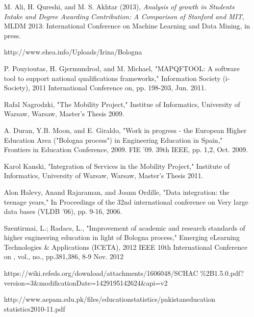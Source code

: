 \documentclass[12pt,a4paper,oneside]{book}
\begin{document}
	
	
	
	




\begin{thebibliography}{10}

M. Ali, H. Qureshi, and M. S. Akhtar (2013), \emph{Analysis of growth in Students Intake and Degree Awarding Contribution: A Comparison of Stanford and MIT}, MLDM 2013: International Conference on Machine Learning and Data Mining, in press.

http://www.ehea.info/Uploads/Irina/Bologna%

P. Pouyioutas, H. Gjermundrod, and M. Michael, "MAPQFTOOL: A software tool to support national qualifications frameworks," Information Society (i-Society), 2011 International Conference on, pp. 198-203, Jun. 2011.

Rafal Nagrodzki, "The Mobility Project," Institue of Informatics, University of Warsaw, Warsaw, Master's Thesis 2009.

A. Duran, Y.B. Moon, and E. Giraldo, "Work in progress - the European Higher Education Area ("Bologna process") in Engineering Education in Spain," Frontiers in Education Conference, 2009. FIE '09. 39th IEEE, pp. 1,2, Oct. 2009.

Karol Kanski, "Integration of Services in the Mobility Project," Institute of Informatics, University of Warsaw, Warsaw, Master's Thesis 2011.

Alon Halevy, Anand Rajaraman, and Joann Ordille, "Data integration: the teenage years," In Proceedings of the 32nd international conference on Very large data bases (VLDB '06), pp. 9-16, 2006.

Szentirmai, L.; Radacs, L., "Improvement of academic and research standards of higher engineering education in light of Bologna process," Emerging eLearning Technologies \& Applications (ICETA), 2012 IEEE 10th International Conference on , vol., no., pp.381,386, 8-9 Nov. 2012

https://wiki.refeds.org/download/attachments/1606048/SCHAC
\%2B1.5.0.pdf?version=3\&modificationDate=1429195142624\&api=v2

http://www.aepam.edu.pk/files/educationstatistics/pakistaneducation
statistics2010-11.pdf


\end{thebibliography}
\end{document}
